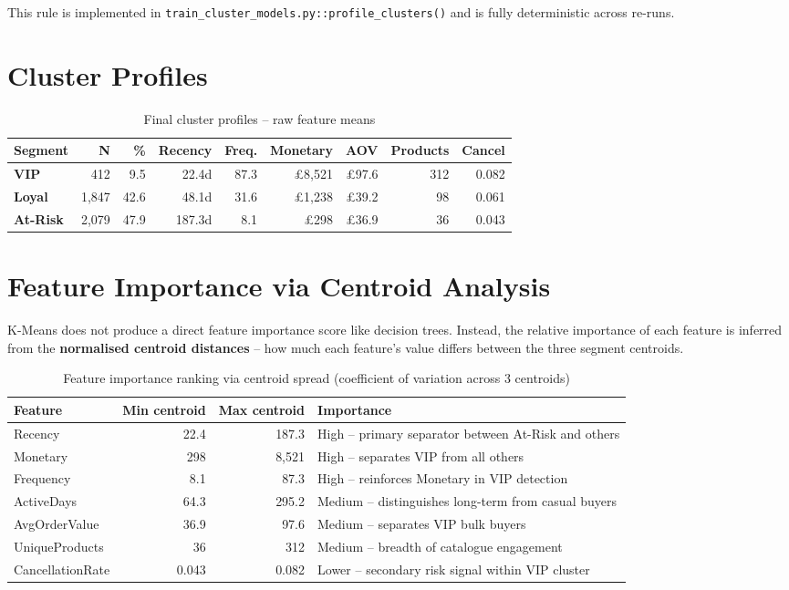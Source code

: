 \documentclass[12pt,a4paper]{report}
\begin{document}
This rule is implemented in \texttt{train\_cluster\_models.py::profile\_clusters()} and is fully deterministic across re-runs.

\section{Cluster Profiles}

\begin{table}[H]
\centering
\caption{Final cluster profiles -- raw feature means}
\begin{tabularx}{\textwidth}{lrrrrrrrr}
\toprule
\textbf{Segment} & \textbf{N} & \textbf{\%} & \textbf{Recency} & \textbf{Freq.} & \textbf{Monetary} & \textbf{AOV} & \textbf{Products} & \textbf{Cancel} \\
\midrule
\textcolor{vipgold}{\textbf{VIP}} & 412 & 9.5 & 22.4d & 87.3 & £8,521 & £97.6 & 312 & 0.082 \\
\textcolor{loyalgreen}{\textbf{Loyal}} & 1,847 & 42.6 & 48.1d & 31.6 & £1,238 & £39.2 & 98 & 0.061 \\
\textcolor{riskred}{\textbf{At-Risk}} & 2,079 & 47.9 & 187.3d & 8.1 & £298 & £36.9 & 36 & 0.043 \\
\bottomrule
\end{tabularx}
\end{table}

\section{Feature Importance via Centroid Analysis}

K-Means does not produce a direct feature importance score like decision trees. Instead, the relative importance of each feature is inferred from the \textbf{normalised centroid distances} -- how much each feature's value differs between the three segment centroids.

\begin{table}[H]
\centering
\caption{Feature importance ranking via centroid spread (coefficient of variation across 3 centroids)}
\begin{tabular}{lrrl}
\toprule
\textbf{Feature} & \textbf{Min centroid} & \textbf{Max centroid} & \textbf{Importance} \\
\midrule
Recency & 22.4 & 187.3 & High -- primary separator between At-Risk and others \\
Monetary & 298 & 8,521 & High -- separates VIP from all others \\
Frequency & 8.1 & 87.3 & High -- reinforces Monetary in VIP detection \\
ActiveDays & 64.3 & 295.2 & Medium -- distinguishes long-term from casual buyers \\
AvgOrderValue & 36.9 & 97.6 & Medium -- separates VIP bulk buyers \\
UniqueProducts & 36 & 312 & Medium -- breadth of catalogue engagement \\
CancellationRate & 0.043 & 0.082 & Lower -- secondary risk signal within VIP cluster \\
\bottomrule
\end{tabular}
\end{table}
\end{document}

